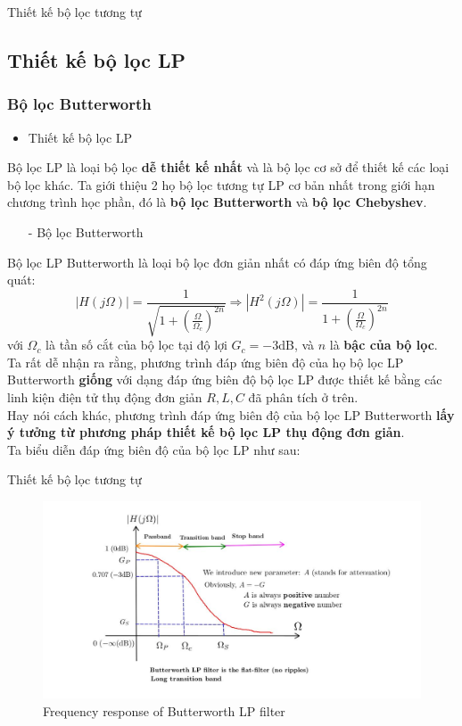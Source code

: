 \documentclass[8pt]{beamer}
\begin{document}
\begin{frame}{Thiết kế bộ lọc tương tự}
\subsection{Thiết kế bộ lọc LP}
\subsubsection{Bộ lọc Butterworth}
\begin{itemize}
	\item Thiết kế bộ lọc LP
\end{itemize}

Bộ lọc LP là loại bộ lọc \textbf{dễ thiết kế nhất} và là \alert{bộ lọc cơ sở để thiết kế các loại bộ lọc khác}. Ta giới thiệu 2 họ bộ lọc tương tự LP cơ bản nhất trong giới hạn chương trình học phần, đó là \textbf{bộ lọc Butterworth} và \textbf{bộ lọc Chebyshev}.
\begin{itemize}
	\item[-] Bộ lọc Butterworth
\end{itemize}
Bộ lọc LP Butterworth là loại bộ lọc đơn giản nhất có đáp ứng biên độ tổng quát:
$$|H(j\Omega)|=\frac{1}{\sqrt{1+\left(\frac{\Omega}{\Omega_{c}}\right)^{2n}}}\Rightarrow |H^{2}(j\Omega)|=\frac{1}{1+\left(\frac{\Omega}{\Omega_{c}}\right)^{2n}}$$
với $\Omega_{c}$ là \alert{tần số cắt của bộ lọc} tại độ lợi \alert{$G_{c}=-3$dB}, và $n$ là \textbf{bậc của bộ lọc}.
\\ Ta rất dễ nhận ra rằng, phương trình đáp ứng biên độ của họ bộ lọc LP Butterworth \textbf{giống} với dạng đáp ứng biên độ bộ lọc LP được thiết kế bằng các linh kiện điện tử thụ động đơn giản $R,L,C$ đã phân tích ở trên.
\\ Hay nói cách khác, phương trình đáp ứng biên độ của bộ lọc LP Butterworth \textbf{lấy ý tưởng từ phương pháp thiết kế bộ lọc LP thụ động đơn giản}.
\\ Ta biểu diễn đáp ứng biên độ của bộ lọc LP như sau:
\end{frame}
\begin{frame}{Thiết kế bộ lọc tương tự}
\begin{figure}[h]
			\includegraphics[width=1\textwidth]{12.jpg}
		\caption{Frequency response of Butterworth LP filter}			\label{fig:re2}
		\end{figure}

\end{frame}
\end{document}
